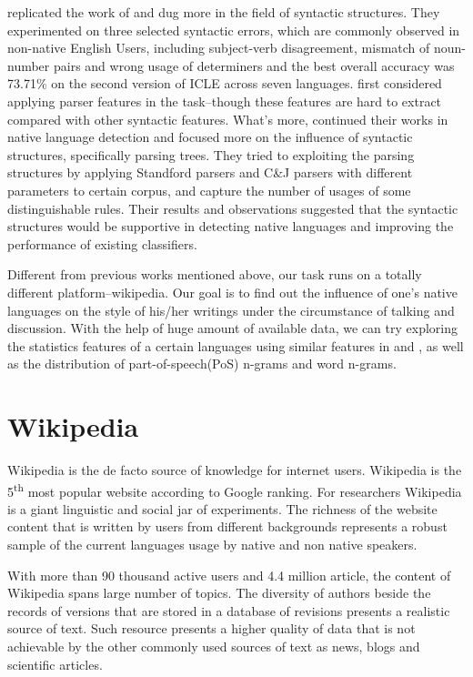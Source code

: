 \documentclass[11pt]{article}
\begin{document}
\cite {wong2009contrastive} replicated the work of \cite {koppel2005automatically} and dug more in the field of syntactic structures. They experimented on three selected syntactic errors, which are commonly observed in non-native English Users, including subject-verb disagreement, mismatch of noun-number pairs and wrong usage of determiners and the best overall accuracy was 73.71\% on the second version of ICLE across seven languages. \cite {wong2010parser} first considered applying parser features in the task--though these features are hard to extract compared with other syntactic features. What's more, \cite {wong-dras:2011:EMNLP} continued their works in native language detection and focused more on the influence of syntactic structures, specifically parsing trees. They tried to exploiting the parsing structures by applying Standford parsers and C\&J parsers with different parameters to certain corpus, and capture the number of usages of some distinguishable rules. Their results and observations suggested that the syntactic structures would be supportive in detecting native languages and improving the performance of existing classifiers.

Different from previous works mentioned above, our task runs on a totally different platform--wikipedia. Our goal is to find out the influence of one's native languages on the style of his/her writings under the circumstance of talking and discussion. With the help of huge amount of available data, we can try exploring the statistics features of a certain languages using similar features in \cite {koppel2005automatically} and \cite {wong-dras:2011:EMNLP}, as well as the distribution of part-of-speech(PoS) n-grams and word n-grams.      

\section{Wikipedia}
Wikipedia is the de facto source of knowledge for internet users. Wikipedia is the 5\textsuperscript{th} most popular website according to Google ranking. For researchers Wikipedia is a giant linguistic and social jar of experiments. The richness of the website content that is written by users from different backgrounds represents a robust sample of the current languages usage by native and non native speakers.

With more than 90 thousand active users and 4.4 million article, the content of Wikipedia spans large number of topics. The diversity of authors beside the records of versions that are stored in a database of revisions presents a realistic source of text. Such resource presents a higher quality of data that is not achievable by the other commonly used sources of text as news, blogs and scientific articles.
\end{document}
